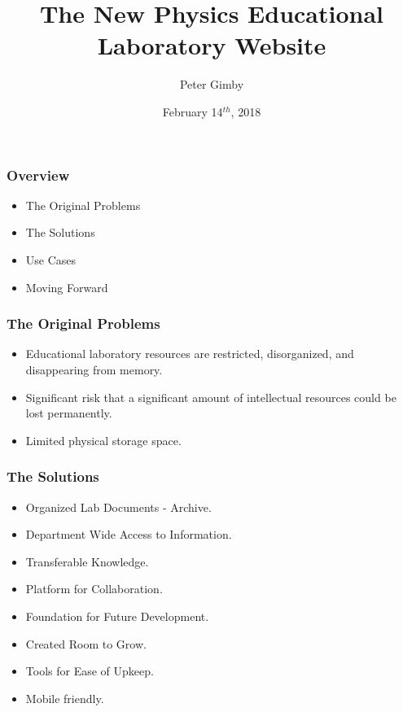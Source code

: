 \documentclass{beamer} %
\title[PJL Website]{The New Physics Educational Laboratory Website}
\author{Peter Gimby}
\institute[UCalgary]{University of Calgary}
\date{February 14$^{th}$, 2018}
\begin{document}
\frame[plain]{\titlepage}

\begin{frame}
\frametitle{Overview}
	\begin{itemize}
		\item{The Original Problems}
		\item{The Solutions}
		\item{Use Cases}
		\item{Moving Forward}
	\end{itemize}
\end{frame}
	
\begin{frame}
\frametitle{The Original Problems}\color{black}
	\begin{itemize}
    		\item Educational laboratory resources are restricted, disorganized, and 							disappearing from memory.
		\item Significant risk that a significant amount of intellectual 									resources could be lost permanently.
		\item Limited physical storage space.
	\end{itemize}
\end{frame}


\begin{frame}
\frametitle{The Solutions}\color{black}
	\begin{itemize}
		\item Organized Lab Documents - Archive.
		\item Department Wide Access to Information.
		\item Transferable Knowledge.
		\item Platform for Collaboration.
		\item Foundation for Future Development.
		\item Created Room to Grow.
		\item Tools for Ease of Upkeep.
		\item Mobile friendly.
	\end{itemize}
\end{frame}
\end{document}
